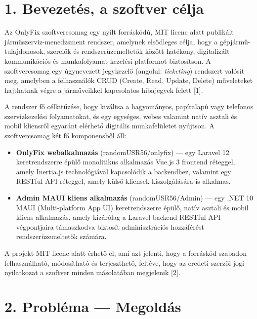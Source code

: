 \section{1. Bevezetés, a szoftver célja}\label{bevezetuxe9s-a-szoftver-cuxe9lja}

Az OnlyFix szoftvercsomag egy nyílt forráskódú, MIT licenc alatt publikált járműszerviz-menedzsment rendszer, amelynek elsődleges célja, hogy a gépjármű-tulajdonosok, szerelők és rendszerüzemeltetők között hatékony, digitalizált kommunikációs és munkafolyamat-kezelési platformot biztosítson. A szoftvercsomag egy úgynevezett jegykezelő (angolul: \emph{ticketing}) rendszert valósít meg, amelyben a felhasználók CRUD (Create, Read, Update, Delete) műveleteket hajthatnak végre a járműveikkel kapcsolatos hibajegyek felett {[}1{]}.

A rendszer fő célkitűzése, hogy kiváltsa a hagyományos, papíralapú vagy telefonos szervizkezelési folyamatokat, és egy egységes, webes valamint natív asztali és mobil kliensről egyaránt elérhető digitális munkafelületet nyújtson. A szoftvercsomag két fő komponensből áll:

\begin{itemize}
\item
  \textbf{OnlyFix webalkalmazás} (randomUSR56/onlyfix) --- egy Laravel 12 keretrendszerre épülő monolitikus alkalmazás Vue.js 3 frontend réteggel, amely Inertia.js technológiával kapcsolódik a backendhez, valamint egy RESTful API réteggel, amely külső kliensek kiszolgálására is alkalmas.
\item
  \textbf{Admin MAUI kliens alkalmazás} (randomUSR56/Admin) --- egy .NET 10 MAUI (Multi-platform App UI) keretrendszerre épülő, natív asztali és mobil kliens alkalmazás, amely kizárólag a Laravel backend RESTful API végpontjaira támaszkodva biztosít adminisztrációs hozzáférést rendszerüzemeltetők számára.
\end{itemize}

A projekt MIT licenc alatt érhető el, ami azt jelenti, hogy a forráskód szabadon felhasználható, módosítható és terjeszthető, feltéve, hogy az eredeti szerzői jogi nyilatkozat a szoftver minden másolatában megjelenik {[}2{]}.

\protect{}\label{_Toc223012183}{}

\section{2. Probléma --- Megoldás}\label{probluxe9ma-megolduxe1s}

